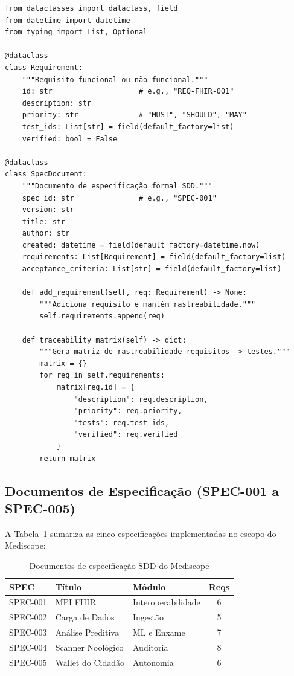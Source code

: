 \begin{lstlisting}[style=pythonstyle, caption=Estrutura formal de uma SPEC (ds_base.py), label=code:spec_base]
from dataclasses import dataclass, field
from datetime import datetime
from typing import List, Optional

@dataclass
class Requirement:
    """Requisito funcional ou não funcional."""
    id: str                    # e.g., "REQ-FHIR-001"
    description: str
    priority: str              # "MUST", "SHOULD", "MAY"
    test_ids: List[str] = field(default_factory=list)
    verified: bool = False

@dataclass
class SpecDocument:
    """Documento de especificação formal SDD."""
    spec_id: str               # e.g., "SPEC-001"
    version: str
    title: str
    author: str
    created: datetime = field(default_factory=datetime.now)
    requirements: List[Requirement] = field(default_factory=list)
    acceptance_criteria: List[str] = field(default_factory=list)
    
    def add_requirement(self, req: Requirement) -> None:
        """Adiciona requisito e mantém rastreabilidade."""
        self.requirements.append(req)
    
    def traceability_matrix(self) -> dict:
        """Gera matriz de rastreabilidade requisitos -> testes."""
        matrix = {}
        for req in self.requirements:
            matrix[req.id] = {
                "description": req.description,
                "priority": req.priority,
                "tests": req.test_ids,
                "verified": req.verified
            }
        return matrix
\end{lstlisting}

\subsection{Documentos de Especificação (SPEC-001 a SPEC-005)}

A Tabela~\ref{tab:specs_summary} sumariza as cinco especificações implementadas no escopo do Mediscope:

\begin{table}[htb]
\centering
\caption{Documentos de especificação SDD do Mediscope}
\label{tab:specs_summary}
\small
\begin{tabular}{lllc}
\toprule
\textbf{SPEC} & \textbf{Título} & \textbf{Módulo} & \textbf{Reqs} \\
\midrule
SPEC-001 & MPI FHIR & Interoperabilidade & 6 \\
SPEC-002 & Carga de Dados & Ingestão & 5 \\
SPEC-003 & Análise Preditiva & ML e Enxame & 7 \\
SPEC-004 & Scanner Noológico & Auditoria & 8 \\
SPEC-005 & Wallet do Cidadão & Autonomia & 6 \\
\bottomrule
\end{tabular}
\end{table}

